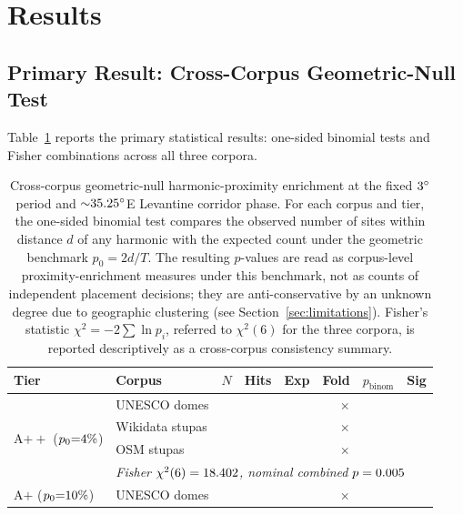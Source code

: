 \documentclass[12pt,a4paper]{article}
\newcommand{\degr}{\ifmmode^\circ\else\textdegree{}\fi}
\begin{document}
\section{Results}
\label{sec:results}

\subsection{Primary Result: Cross-Corpus Geometric-Null Test}

Table~\ref{tab:cross_corpus_geo} reports the primary statistical
results: one-sided binomial tests and Fisher combinations across all
three corpora.

\begin{table}[ht]
\centering
\caption{Cross-corpus geometric-null harmonic-proximity enrichment at
the fixed $3\degr$ period and ${\sim}35.25\degr$E Levantine corridor
phase. For each corpus and tier, the one-sided binomial test compares
the observed number of sites within distance $d$ of any harmonic with
the expected count under
the geometric benchmark $p_0 = 2d/T$. The resulting $p$-values are read
as corpus-level proximity-enrichment measures under this benchmark, not
as counts of independent placement decisions; they are anti-conservative
by an unknown degree due to geographic clustering (see
Section~\ref{sec:limitations}). Fisher's statistic
$\chi^2 = -2\sum\ln p_i$, referred to $\chi^2(6)$ for the three
corpora, is reported descriptively as a cross-corpus consistency
summary.}
\label{tab:cross_corpus_geo}
\small
\begin{tabular}{llrrrrrl}
\toprule
Tier & Corpus & $N$ & Hits & Exp & Fold & $p_\mathrm{binom}$ & Sig \\
\midrule
\multirow{4}{*}{A$++$ ($p_0{=}4\%{}$)}
  & UNESCO domes    & \geoDomeAppN{} & \geoDomeAppHits{} & \geoDomeAppExp{} & \geoDomeAppEnr{}$\times$ & \geoDomeAppP{} & \geoDomeAppSig{} \\
  & Wikidata stupas & \geoWikiAppN{} & \geoWikiAppHits{} & \geoWikiAppExp{} & \geoWikiAppEnr{}$\times$ & \geoWikiAppP{} & \geoWikiAppSig{} \\
  & OSM stupas      & \geoOsmAppN{}  & \geoOsmAppHits{}  & \geoOsmAppExp{}  & \geoOsmAppEnr{}$\times$  & \geoOsmAppP{}  & \geoOsmAppSig{} \\
  & \multicolumn{7}{l}{\textit{Fisher $\chi^2(6) = 18.402{}$, nominal combined $p = 0.005{}$}} \\
\midrule
\multirow{4}{*}{A$+$ ($p_0{=}10\%{}$)}
  & UNESCO domes    & \geoDomeApN{}  & \geoDomeApHits{}  & \geoDomeApExp{}  & \geoDomeApEnr{}$\times$  & \geoDomeApP{}  & \geoDomeApSig{} \\

\end{tabular}
\end{table}
\end{document}
